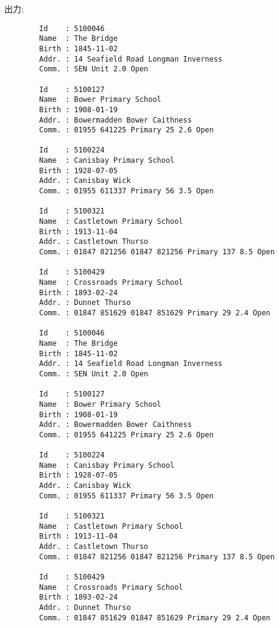         出力:
        \begin{verbatim}
        Id    : 5100046
        Name  : The Bridge
        Birth : 1845-11-02
        Addr. : 14 Seafield Road Longman Inverness
        Comm. : SEN Unit 2.0 Open

        Id    : 5100127
        Name  : Bower Primary School
        Birth : 1908-01-19
        Addr. : Bowermadden Bower Caithness
        Comm. : 01955 641225 Primary 25 2.6 Open

        Id    : 5100224
        Name  : Canisbay Primary School
        Birth : 1928-07-05
        Addr. : Canisbay Wick
        Comm. : 01955 611337 Primary 56 3.5 Open

        Id    : 5100321
        Name  : Castletown Primary School
        Birth : 1913-11-04
        Addr. : Castletown Thurso
        Comm. : 01847 821256 01847 821256 Primary 137 8.5 Open

        Id    : 5100429
        Name  : Crossroads Primary School
        Birth : 1893-02-24
        Addr. : Dunnet Thurso
        Comm. : 01847 851629 01847 851629 Primary 29 2.4 Open

        Id    : 5100046
        Name  : The Bridge
        Birth : 1845-11-02
        Addr. : 14 Seafield Road Longman Inverness
        Comm. : SEN Unit 2.0 Open

        Id    : 5100127
        Name  : Bower Primary School
        Birth : 1908-01-19
        Addr. : Bowermadden Bower Caithness
        Comm. : 01955 641225 Primary 25 2.6 Open

        Id    : 5100224
        Name  : Canisbay Primary School
        Birth : 1928-07-05
        Addr. : Canisbay Wick
        Comm. : 01955 611337 Primary 56 3.5 Open

        Id    : 5100321
        Name  : Castletown Primary School
        Birth : 1913-11-04
        Addr. : Castletown Thurso
        Comm. : 01847 821256 01847 821256 Primary 137 8.5 Open

        Id    : 5100429
        Name  : Crossroads Primary School
        Birth : 1893-02-24
        Addr. : Dunnet Thurso
        Comm. : 01847 851629 01847 851629 Primary 29 2.4 Open
        \end{verbatim}
    
